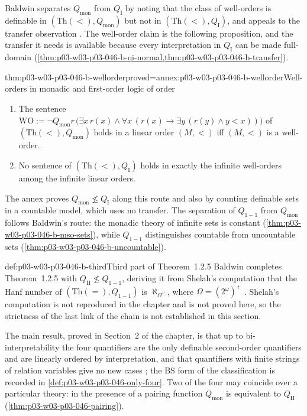 Baldwin separates \(Q_{\mathrm{mon}}\) from \(Q_{\mathrm I}\) by noting that
the class of well-orders is definable in \((\mathrm{Th}(<),Q_{\mathrm{mon}})\)
but not in \((\mathrm{Th}(<),Q_{\mathrm I})\), and appeals to the transfer
observation \cite[p.~449]{Baldwin1985DSOQ}. The well-order claim is the
following proposition, and the transfer it needs is available because every
interpretation in \(Q_{\mathrm I}\) can be made full-domain
(\cref{thm:p03-w03-p03-046-b-qi-normal,thm:p03-w03-p03-046-b-transfer}).

\begin{hblemma}{thm:p03-w03-p03-046-b-wellorder}{proved=annex:p03-w03-p03-046-b-wellorder}{Well-orders in monadic and first-order logic of order}
\begin{enumerate}
  \item The sentence
        \(\mathrm{WO}:=\neg Q_{\mathrm{mon}}r\,\bigl(\exists x\,r(x)\wedge
        \forall x\,(r(x)\to\exists y\,(r(y)\wedge y<x))\bigr)\) of
        \((\mathrm{Th}(<),Q_{\mathrm{mon}})\) holds in a linear order
        \((M,<)\) iff \((M,<)\) is a well-order.
  \item No sentence of \((\mathrm{Th}(<),Q_{\mathrm I})\) holds in exactly
        the infinite well-orders among the infinite linear orders.
\end{enumerate}
\end{hblemma}

The annex proves \(Q_{\mathrm{mon}}\not\le Q_{\mathrm I}\) along this route
and also by counting definable sets in a countable model, which uses no
transfer. The separation of \(Q_{1-1}\) from
\(Q_{\mathrm{mon}}\) follows Baldwin's route: the monadic theory of
infinite sets is constant (\cref{thm:p03-w03-p03-046-b-mso-sets}), while
\(Q_{1-1}\) distinguishes countable from uncountable sets
(\cref{thm:p03-w03-p03-046-b-uncountable}).

\begin{proofboundary}{def:p03-w03-p03-046-b-third}{Third part of Theorem~1.2.5}
Baldwin completes Theorem~1.2.5 with \(Q_{\mathrm{II}}\not\le Q_{1-1}\),
deriving it from Shelah's computation that the Hanf number of
\((\mathrm{Th}(=),Q_{1-1})\) is \(\aleph_{\Omega^\omega}\), where
\(\Omega=(2^\omega)^+\) \cite[pp.~445, 449]{Baldwin1985DSOQ}. Shelah's
computation is not reproduced in the chapter and is not proved here, so
the strictness of the last link of the chain is not established in this
section.
\end{proofboundary}

The main result, proved in Section~2 of the chapter, is that up to
bi-interpretability the four quantifiers are the only definable
second-order quantifiers and are linearly ordered by interpretation, and
that quantifiers with finite strings of relation variables give no new
cases \cite[p.~450]{Baldwin1985DSOQ}; the BS form of the classification
is recorded in \cref{def:p03-w03-p03-046-only-four}. Two of the four may
coincide over a particular theory: in the presence of a pairing function
\(Q_{\mathrm{mon}}\) is equivalent to \(Q_{\mathrm{II}}\)
\cite[p.~448]{Baldwin1985DSOQ} (\cref{thm:p03-w03-p03-046-pairing}).

